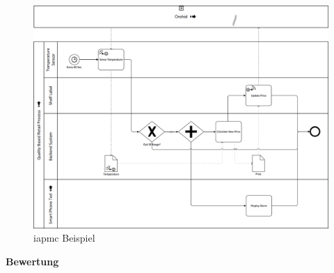 \documentclass[a4paper, 12pt, twoside, headsepline=true]{scrartcl} %
\begin{document}
\begin{figure}[H]
	\includegraphics[height=11 cm,keepaspectratio,center]{figures/iotaprocess}
	\caption{\ac{iapmc} Beispiel\cite[S.81]{conceptsiotawarepm}}
	\label{fig:iotaprocess}
\end{figure} 

\textbf{Bewertung}
\end{document}
